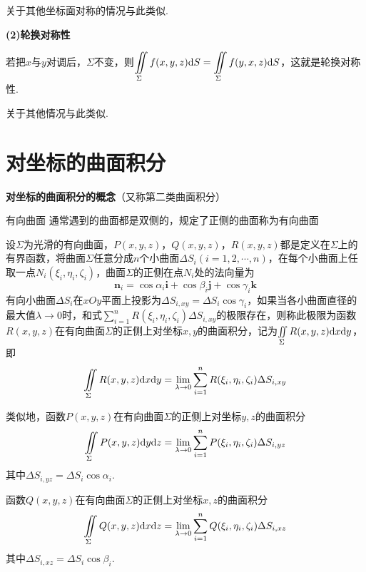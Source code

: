 关于其他坐标面对称的情况与此类似.

\textbf{(2)轮换对称性}

若把$x$与$y$对调后，$\Sigma$不变，则$\displaystyle\iint\limits_{\Sigma}f(x,y,z)\mathrm{d} S=\iint\limits_{\Sigma}f(y,x,z)\mathrm{d} S$，这就是轮换对称性.

关于其他情况与此类似.

\section{对坐标的曲面积分}

\textbf{对坐标的曲面积分的概念}（又称第二类曲面积分）

有向曲面 \quad 通常遇到的曲面都是双侧的，规定了正侧的曲面称为有向曲面

设$\Sigma$为光滑的有向曲面，$P(x,y,z)$，$Q(x,y,z)$，$R(x,y,z)$都是定义在$\Sigma$上的有界函数，将曲面$\Sigma$任意分成$n$个小曲面$\Delta S_i(i=1,2,\cdots,n)$，在每个小曲面上任取一点$N_i(\xi_i,\eta_i,\zeta_i)$，曲面$\Sigma$的正侧在点$N_i$处的法向量为
\begin{equation*}
    \bm{n}_i=\cos\alpha_i\bm{i}+\cos\beta_i\bm{j}+\cos\gamma_i\bm{k}
\end{equation*}
有向小曲面$\Delta S_i$在$xOy$平面上投影为$\Delta S_{i,xy}=\Delta S_i\cos\gamma_i$，如果当各小曲面直径的最大值$\lambda\rightarrow 0$时，和式$\sum_{i=1}^n R(\xi_i,\eta_i,\zeta_i)\Delta S_{i,xy}$的极限存在，则称此极限为函数$R(x,y,z)$在有向曲面$\Sigma$的正侧上对坐标$x,y$的曲面积分，记为$\iint \limits_{\Sigma}R(x,y,z)\mathrm{d} x\mathrm{d} y$，即
\begin{equation*}
    \iint \limits_{\Sigma}R(x,y,z)\mathrm{d} x\mathrm{d} y=\lim_{\lambda\rightarrow 0}\sum_{i=1}^n R(\xi_i,\eta_i,\zeta_i)\Delta S_{i,xy}
\end{equation*}

类似地，函数$P(x,y,z)$在有向曲面$\Sigma$的正侧上对坐标$y,z$的曲面积分
\begin{equation*}
    \iint \limits_{\Sigma}P(x,y,z)\mathrm{d} y\mathrm{d} z=\lim_{\lambda\rightarrow 0}\sum_{i=1}^n P(\xi_i,\eta_i,\zeta_i)\Delta S_{i,yz}
\end{equation*}
其中$\Delta S_{i,yz}=\Delta S_i\cos\alpha_i$.

函数$Q(x,y,z)$在有向曲面$\Sigma$的正侧上对坐标$x,z$的曲面积分
\begin{equation*}
    \iint \limits_{\Sigma}Q(x,y,z)\mathrm{d} x\mathrm{d} z=\lim_{\lambda\rightarrow 0}\sum_{i=1}^n Q(\xi_i,\eta_i,\zeta_i)\Delta S_{i,xz}
\end{equation*}
其中$\Delta S_{i,xz}=\Delta S_i\cos\beta_i$.


